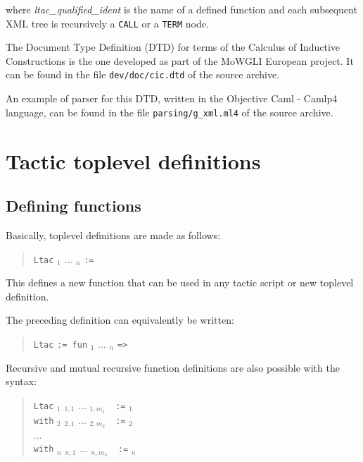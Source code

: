 \medskip
\noindent where \textsl{ltac\_qualified\_ident} is the name of a
defined {\ltac} function and each subsequent XML tree is recursively a
\texttt{CALL} or a \texttt{TERM} node.

The Document Type Definition (DTD) for terms of the Calculus of
Inductive Constructions is the one developed as part of the MoWGLI
European project. It can be found in the file {\tt dev/doc/cic.dtd} of
the {\Coq} source archive.

An example of parser for this DTD, written in the Objective Caml -
Camlp4 language, can be found in the file {\tt parsing/g\_xml.ml4} of
the {\Coq} source archive.

\section{Tactic toplevel definitions}

\subsection{Defining {\ltac} functions}

Basically, {\ltac} toplevel definitions are made as follows:
%
%
\begin{quote}
{\tt Ltac} {\ident} {\ident}$_1$ ... {\ident}$_n$ {\tt :=}
{\tacexpr}
\end{quote}
This defines a new {\ltac} function that can be used in any tactic
script or new {\ltac} toplevel definition.

\Rem The preceding definition can equivalently be written:
\begin{quote}
{\tt Ltac} {\ident} {\tt := fun} {\ident}$_1$ ... {\ident}$_n$
{\tt =>} {\tacexpr}
\end{quote}
Recursive and mutual recursive function definitions are also
possible with the syntax:
\begin{quote}
{\tt Ltac} {\ident}$_1$ {\ident}$_{1,1}$ ...
{\ident}$_{1,m_1}$~~{\tt :=} {\tacexpr}$_1$\\
{\tt with} {\ident}$_2$ {\ident}$_{2,1}$ ... {\ident}$_{2,m_2}$~~{\tt :=}
{\tacexpr}$_2$\\
...\\
{\tt with} {\ident}$_n$ {\ident}$_{n,1}$ ... {\ident}$_{n,m_n}$~~{\tt :=}
{\tacexpr}$_n$
\end{quote}

